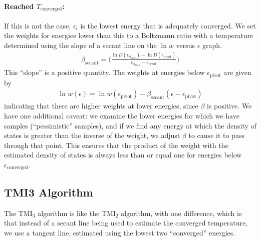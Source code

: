 \documentclass[letterpaper,twocolumn,amsmath,amssymb,pre,aps,10pt]{revtex4-1}
\begin{document}
\paragraph{Reached $T_\text{converged}$:}
If this is not the case, $\epsilon_i$ is the lowest energy that is
adequately converged.  We set the weights for energies lower than this
to a Boltzmann ratio with a temperature determined using the slope of
a secant line on the $\ln w$ versus $\epsilon$ graph.
\begin{align}
  \beta_\text{secant} = \bigg(\frac{\ln{D}(\epsilon_{S_{\max}}) - \ln{D}
  (\epsilon_\text{pivot})}{\epsilon_{S_{\max}}-\epsilon_\text{pivot}}\bigg)
\end{align}
This ``slope'' is a positive quantity.  The weights at energies below
$\epsilon_\text{pivot}$ are given by
\begin{align}
  \ln w(\epsilon) = \ln w(\epsilon_\text{pivot}) -
  \beta_\text{secant}(\epsilon - \epsilon_\text{pivot})
\end{align}
indicating that there are higher weights at lower energies, since
$\beta$ is positive.  We have one additional caveat: we examine the
lower energies for which we have samples (``pessimistic'' samples),
and if we find any energy at which the density of states is greater
than the inverse of the weight, we adjust $\beta$ to cause it to pass
through that point.  This ensures that the product of the weight with
the estimated density of states is always less than or equal one for
energies below $\epsilon_\text{converged}$.



\subsection{TMI3 Algorithm}
The TMI$_3$ algorithm is like the TMI$_2$ algorithm, with one
difference, which is that instead of a secant line being used to
estimate the converged temperature, we use a tangent line, estimated
using the lowest two ``converged'' energies.
\end{document}
